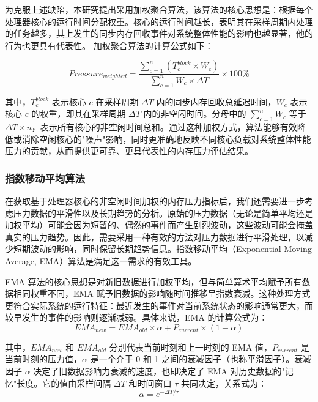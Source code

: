 为克服上述缺陷，本研究提出采用加权聚合算法，该算法的核心思想是：根据每个处理器核心的运行时间分配权重。核心的运行时间越长，表明其在采样周期内处理的任务越多，其上发生的同步内存回收事件对系统整体性能的影响也越显著，他的行为也更具有代表性。 加权聚合算法的计算公式如下：

\begin{equation}
    Pressure_{weighted} = \frac{\sum_{c=1}^{n} (T_c^{block} \times W_c)}{\sum_{c=1}^{n} W_c \times \Delta T} \times 100\%
\end{equation}

其中，\(T_c^{block}\) 表示核心 \(c\) 在采样周期 \(\Delta T\) 内的同步内存回收总延迟时间，\(W_c\) 表示核心 \(c\) 的权重，即其在采样周期 \(\Delta T\) 内的非空闲时间。分母中的 \(\sum_{c=1}^{n} W_c\) 等于 \(\Delta T \times n\)，表示所有核心的非空闲时间总和。通过这种加权方式，算法能够有效降低或消除空闲核心的"噪声"影响，同时更准确地反映不同核心负载对系统整体性能压力的贡献，从而提供更可靠、更具代表性的内存压力评估结果。

\subsubsection{指数移动平均算法}

在获取基于处理器核心的非空闲时间加权的内存压力指标后，我们还需要进一步考虑压力数据的平滑性以及长期趋势的分析。原始的压力数据（无论是简单平均还是加权平均）可能会因为短暂的、偶然的事件而产生剧烈波动，这些波动可能会掩盖真实的压力趋势。因此，需要采用一种有效的方法对压力数据进行平滑处理，以减少短期波动的影响，同时保留长期趋势信息。指数移动平均（Exponential Moving Average, EMA）算法是满足这一需求的有效工具。

EMA 算法的核心思想是对新旧数据进行加权平均，但与简单算术平均赋予所有数据相同权重不同，EMA 赋予旧数据的影响随时间推移呈指数衰减。这种处理方式更符合实际系统的运行特征：最近发生的事件对当前系统状态的影响通常更大，而较早发生的事件的影响则逐渐减弱。具体来说，EMA 的计算公式为：
\begin{equation}
    EMA_{new} = EMA_{old} \times \alpha + P_{current} \times (1 - \alpha)
    \label{eq:EMA}
\end{equation}


其中，\(EMA_{new}\) 和 \(EMA_{old}\) 分别代表当前时刻和上一时刻的 EMA 值，\(P_{current}\) 是当前时刻的压力值，\(\alpha\) 是一个介于 0 和 1 之间的衰减因子（也称平滑因子）。衰减因子 \(\alpha\) 决定了旧数据影响力衰减的速度，也即决定了 EMA 对历史数据的"记忆"长度。它的值由采样间隔 \(\Delta T\) 和时间窗口 \(\tau\) 共同决定，关系式为：
\[
\alpha = e^{-\Delta T / \tau}
\]

